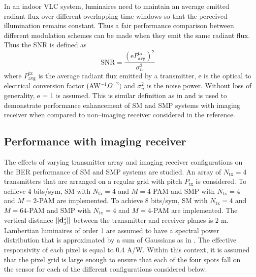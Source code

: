 In an indoor VLC system, luminaires need to maintain an average emitted radiant flux over different overlapping time windows so that the perceived illumination remains constant. Thus a fair performance comparison between different modulation schemes can be made when they emit the same radiant flux. Thus the SNR is defined as
\begin{equation}
  \label{eqOSMSNRTX}
	\text{SNR} = \frac{(\text{e}P_{\text{avg}}^{\text{tx}})^2}{\sigma_{n}^2}
\end{equation}
where $P_{\text{avg}}^{\text{tx}}$ is the average radiant flux emitted by a transmitter, e is the optical to electrical conversion factor (AW$^{-1}\Omega^{-2})$ and $\sigma_{n}^2$ is the noise power. Without loss of generality, e = 1 is assumed. This is similar definition as in \cite{fat13a} and is used to demonstrate performance enhancement of SM and SMP systems with imaging receiver when compared to non--imaging receiver considered in the reference.

\subsection{Performance with imaging receiver}
\label{subsec:osmAnalysis}

The effects of varying transmitter array and imaging receiver configurations on the BER performance of SM and SMP systems are studied. An array of $N_{\text{tx}} = 4$ transmitters that are arranged on a regular grid with pitch $P_{\text{tx}}$ is considered. To achieve 4 bits/sym, SM with $N_{\text{tx}}=4$ and $M=4$-PAM and SMP with $N_{\text{tx}}=4$ and $M=2$-PAM are implemented. To achieve 8 bits/sym, SM with $N_{\text{tx}}=4$ and $M=64$-PAM and SMP with $N_{\text{tx}}=4$ and $M=4$-PAM are implemented. The vertical distance $||{\bf{d}}^{z}_{j}||$ between the transmitter and receiver planes is 2 m. Lambertian luminaires of order 1 are assumed to have a spectral power distribution that is approximated by a sum of Gaussians as in \cite{gru08b}. The effective responsivity of each pixel is equal to 0.4 A/W. Within this context, it is assumed that the pixel grid is large enough to ensure that each of the four spots fall on the sensor for each of the different configurations considered below.

